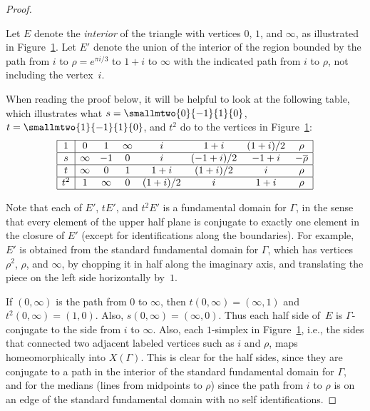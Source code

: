 \documentclass{report}
\begin{document}
\begin{proof}
\begin{figure}
\begin{center}
\caption{\label{fig:etriangle}}
\end{center}
\end{figure}
Let $E$ denote the {\em interior} of the triangle with vertices
$0$, $1$, and $\infty$, as illustrated in
Figure~\ref{fig:etriangle}. Let $E'$ denote the union of the
interior of the region bounded by the path from $i$ to
$\rho=e^{\pi i/3}$ to $1+i$ to $\infty$ with the indicated path
from $i$ to $\rho$, not including the vertex~$i$.

When reading the proof below,  it will be helpful to look at the
following table, which illustrates what
$s=\smallmtwo{0}{-1}{1}{\hfill0}$,
$t=\smallmtwo{1}{-1}{1}{\hfill0}$, and $t^2$ do to the vertices in
Figure~\ref{fig:etriangle}:
\begin{equation}\label{eqn:staction}
\begin{array}{|c|ccccccc|}\hline
  1 & 0 & 1 & \infty & i & 1+i & (1+i)/2 & \rho \\\hline
  s & \infty & -1 & 0 & i & (-1+i)/2 &  -1+i & -\overline{\rho}
  \\\hline
  t & \infty & 0 & 1 & 1+i & (1+i)/2 & i & \rho \\\hline
  t^2 & 1 & \infty & 0 & (1+i)/2 & i & 1+i & \rho \\\hline
\end{array}
\end{equation}


Note that each of $E'$, $tE'$, and $t^2E'$ is a fundamental domain
for $\Gamma$, in the sense that every element of the upper half
plane is conjugate to exactly one element in the closure of $E'$
(except for identifications along the boundaries). For example,
$E'$ is obtained from the standard fundamental domain for
$\Gamma$, which has vertices $\rho^2$, $\rho$, and $\infty$, by
chopping it in half along the imaginary axis, and translating the
piece on the left side horizontally by~$1$.

If $(0,\infty)$ is the path from $0$ to $\infty$, then
$t(0,\infty)=(\infty,1)$ and $t^2(0,\infty)=(1,0)$.  Also,
$s(0,\infty)=(\infty,0)$.  Thus each half side of~$E$ is
$\Gamma$-conjugate to the side from $i$ to $\infty$.  Also, each
$1$-simplex in Figure~\ref{fig:etriangle}, i.e., the sides that
connected two adjacent labeled vertices such as $i$ and $\rho$,
maps homeomorphically into $X(\Gamma)$.  This is clear for the
half sides, since they are conjugate to a path in the interior of
the standard fundamental domain for $\Gamma$, and for the medians
(lines from midpoints to $\rho$) since the path from $i$ to $\rho$
is on an edge of the standard fundamental domain with no self
identifications.


\end{proof}
\end{document}
